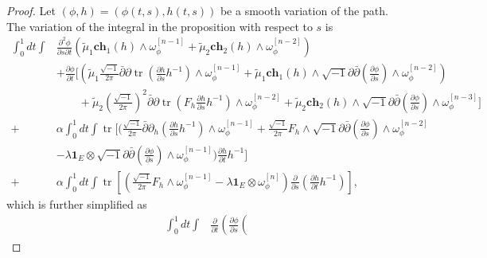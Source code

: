 \documentclass[10pt,a4paper]{amsart}
\newcommand{\tr}{\operatorname{tr}}
\begin{document}
\begin{proof}
Let $\left(\phi,h\right)=\left(\phi(t,s),h(t,s)\right)$ be a smooth variation of the path.  The variation of the integral in the proposition with respect to $s$ is 
\begin{equation}
\begin{split}
    \int_0^1 dt \int 
    & \frac{\partial^2 \phi}{\partial s\partial t}\left( 
    \widetilde\mu_1 \mathbf{ch}_1\left(h\right)\wedge \omega_\phi^{[n-1]} 
    + 
    \widetilde\mu_2 \mathbf{ch}_2\left(h\right)\wedge \omega_\phi^{[n-2]}\right) \\
    & + 
    \frac{\partial \phi}{\partial t}
    \Bigg[ \left( \widetilde\mu_1 \frac{\sqrt{-1}}{2\pi}\bar\partial \partial \tr \left(\frac{\partial h}{\partial s}h^{-1}\right)\wedge \omega_\phi^{[n-1]} 
    + 
    \widetilde\mu_1 \mathbf{ch}_1\left(h\right)\wedge \sqrt{-1}\partial\bar\partial\left(\frac{\partial \phi}{\partial s}\right)\wedge \omega_\phi^{[n-2]}\right)\\
    & \qquad + 
    \widetilde\mu_2 \left(\frac{\sqrt{-1}}{2\pi}\right)^2\bar\partial \partial \tr \left( F_h\frac{\partial h}{\partial s}h^{-1}\right)\wedge\omega_\phi^{[n-2]}
    + 
    \widetilde\mu_2 \mathbf{ch}_2\left(h\right)\wedge \sqrt{-1}\partial\bar\partial \left(\frac{\partial \phi}{\partial s}\right)\wedge \omega_\phi^{[n-3]}\Bigg]\\
     + 
    &\alpha\int_0^1 dt \int 
     \tr \Bigg[
    \Bigg(\frac{\sqrt{-1}}{2\pi}\bar\partial \partial_h \left(\frac{\partial h}{\partial s}h^{-1}\right)\wedge\omega_\phi^{[n-1]}
    + 
    \frac{\sqrt{-1}}{2\pi}F_h \wedge \sqrt{-1}\partial\bar\partial\left(\frac{\partial\phi}{\partial s}\right)\wedge\omega_\phi^{[n-2]}\\
   & -
    \lambda \mathbf{1}_E\otimes \sqrt{-1}\partial\bar\partial\left(\frac{\partial\phi}{\partial s}\right)\wedge\omega_\phi^{[n-1]}\Bigg)\frac{\partial h}{\partial t}h^{-1}
    \Bigg]\\
     + 
    &\alpha\int_0^1 dt\int 
     \tr
    \left[ 
    \left(
    \frac{\sqrt{-1}}{2\pi}F_h\wedge \omega_\phi^{[n-1]}
    - 
    \lambda \mathbf{1}_E \otimes \omega_\phi^{[n]}\right)\frac{\partial}{\partial s}\left( \frac{\partial h}{\partial t}h^{-1}\right)
    \right],
    \end{split}
    \end{equation}
which is further simplified as
    \begin{equation}
    \begin{split}
    \int_0^1 dt \int 
    & \frac{\partial}{\partial t}\left(\frac{\partial \phi}{\partial s}\left( 

\end{split}
\end{equation}
\end{proof}
\end{document}
